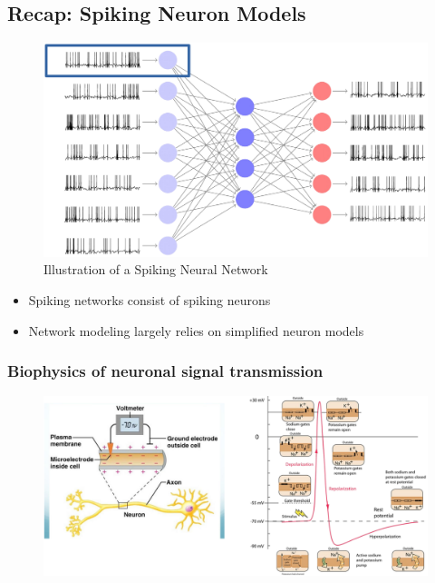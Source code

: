 \documentclass[main]{subfiles}
\begin{document}
\subsection{Recap: Spiking Neuron Models}
\begin{figure}[H]
    \centering
    \includegraphics[width=0.8\linewidth]{10_DeepLearningWithSpikes/figures/snn.png}
    \caption{Illustration of a Spiking Neural Network}
    \label{fig:my_label}
\end{figure}

\begin{itemize}
    \item Spiking networks consist of spiking neurons
    \item Network modeling largely relies on simplified neuron models
\end{itemize}

\subsubsection{Biophysics of neuronal signal transmission}
\begin{figure}[H]
    \centering
    \includegraphics[width=0.99\linewidth]{10_DeepLearningWithSpikes/figures/biophysics.png}
    \caption{}
    \label{fig:my_label}
\end{figure}
\end{document}
